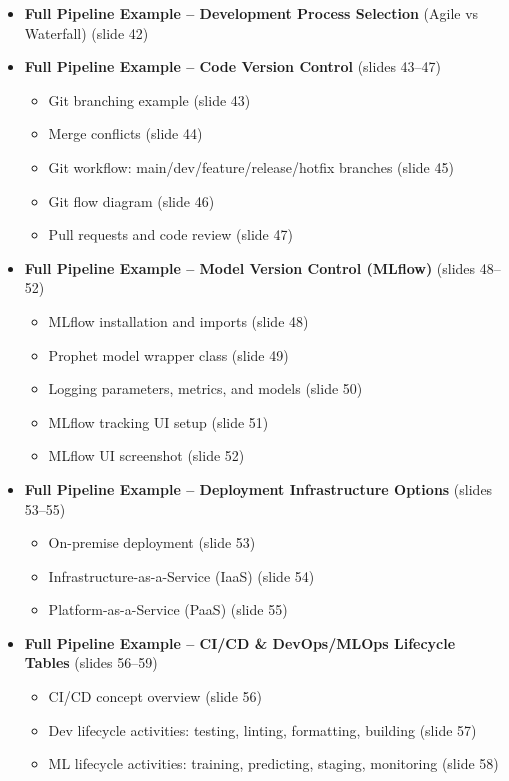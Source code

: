 \begin{itemize}
    \item \textbf{Full Pipeline Example -- Development Process Selection} (Agile vs Waterfall) (slide 42)
    \item \textbf{Full Pipeline Example -- Code Version Control} (slides 43--47)
    \begin{itemize}
        \item Git branching example (slide 43)
        \item Merge conflicts (slide 44)
        \item Git workflow: main/dev/feature/release/hotfix branches (slide 45)
        \item Git flow diagram (slide 46)
        \item Pull requests and code review (slide 47)
    \end{itemize}
    \item \textbf{Full Pipeline Example -- Model Version Control (MLflow)} (slides 48--52)
    \begin{itemize}
        \item MLflow installation and imports (slide 48)
        \item Prophet model wrapper class (slide 49)
        \item Logging parameters, metrics, and models (slide 50)
        \item MLflow tracking UI setup (slide 51)
        \item MLflow UI screenshot (slide 52)
    \end{itemize}
    \item \textbf{Full Pipeline Example -- Deployment Infrastructure Options} (slides 53--55)
    \begin{itemize}
        \item On-premise deployment (slide 53)
        \item Infrastructure-as-a-Service (IaaS) (slide 54)
        \item Platform-as-a-Service (PaaS) (slide 55)
    \end{itemize}
    \item \textbf{Full Pipeline Example -- CI/CD \& DevOps/MLOps Lifecycle Tables} (slides 56--59)
    \begin{itemize}
        \item CI/CD concept overview (slide 56)
        \item Dev lifecycle activities: testing, linting, formatting, building (slide 57)
        \item ML lifecycle activities: training, predicting, staging, monitoring (slide 58)

\end{itemize}
\end{itemize}
